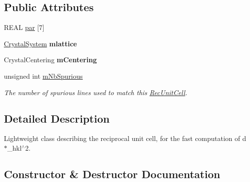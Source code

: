 \subsection*{Public Attributes}
\begin{DoxyCompactItemize}
\item 
R\+E\+AL \mbox{\hyperlink{class_obj_cryst_1_1_rec_unit_cell_a624fa31d8c012440df7a3d7637dae182}{par}} \mbox{[}7\mbox{]}
\item 
\mbox{\label{class_obj_cryst_1_1_rec_unit_cell_ab751018126adbc0306ec2bc5f582547a}} 
\mbox{\hyperlink{namespace_obj_cryst_a9cd1d00f4ec9f0e75564ee151f47dd83}{Crystal\+System}} {\bfseries mlattice}
\item 
\mbox{\label{class_obj_cryst_1_1_rec_unit_cell_a203d74dc8d3b23a592230be7685f45b9}} 
Crystal\+Centering {\bfseries m\+Centering}
\item 
\mbox{\label{class_obj_cryst_1_1_rec_unit_cell_a0a5bc73fa7b294271288309b2e3de80d}} 
unsigned int \mbox{\hyperlink{class_obj_cryst_1_1_rec_unit_cell_a0a5bc73fa7b294271288309b2e3de80d}{m\+Nb\+Spurious}}
\begin{DoxyCompactList}\small\item\em The number of spurious lines used to match this \mbox{\hyperlink{class_obj_cryst_1_1_rec_unit_cell}{Rec\+Unit\+Cell}}. \end{DoxyCompactList}\end{DoxyCompactItemize}


\subsection{Detailed Description}
Lightweight class describing the reciprocal unit cell, for the fast computation of d$\ast$\+\_\+hkl$^\wedge$2. 

\subsection{Constructor \& Destructor Documentation}
\mbox{\label{class_obj_cryst_1_1_rec_unit_cell_a8e5285531d4368e2972431a3a94b259a}} 
